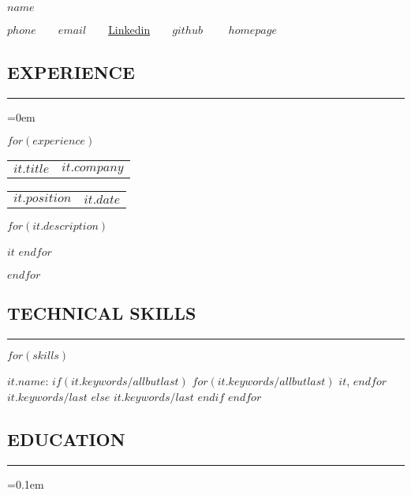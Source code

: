 \documentclass[10pt,letterpaper]{article}
\makeatletter
\newenvironment{indentsection}[1]%
{\begin{list}{}%
	{\setlength{\leftmargin}{#1}}%
	\item[]%
}
{\end{list}}
\newcommand{\headerrow}[2]
{\begin{tabular*}{\linewidth}{l@{\extracolsep{\fill}}r}
	#1 &
	#2 \\
\end{tabular*}}
\makeatother
\begin{document}
\begin{center}
{\LARGE \textbf{$name$}}
\vspace{0.4em}

$phone$\ \ \textbullet \ \
\href{mailto:$email$}{$email$}\ \ \textbullet \ \
\href{https://$linkedin$}{Linkedin}\ \ \textbullet \ \
\href{https://$github$}{$github$} \ \ \textbullet \ \
\href{https://$homepage$}{$homepage$}
\end{center}
\vspace{-16pt}

\subsection*{EXPERIENCE}
\vspace{-0.2em}
\hrule
\vspace{0.4em}
	\parskip=0em

    $for(experience)$
    \headerrow
		{\textbf{$it.title$}}
		{\textbf{$it.company$}}
	\vspace{-6pt}
	\headerrow
		{\emph{$it.position$}}
		{\emph{$it.date$}}
	\begin{itemize*}
        $for(it.description)$
	    \item $it$
        $endfor$
	\end{itemize*}
	\vspace{-4pt}
    $endfor$

\subsection*{TECHNICAL SKILLS}
\vspace{-0.2em}
\hrule
\vspace{0.4em}

	\begin{indentsection}{\parindent}
	\begin{description*}
        $for(skills)$
		\item[$it.name$:]
            $if(it.keywords/allbutlast)$
                $for(it.keywords/allbutlast)$
                    $it$,
                $endfor$
                $it.keywords/last$
            $else$
                $it.keywords/last$
            $endif$
        $endfor$
	\end{description*}
	\end{indentsection}
	\vspace{-4pt}

\subsection*{EDUCATION}
\vspace{-0.2em}
\hrule
\vspace{0.4em}
\parskip=0.1em
\end{document}

